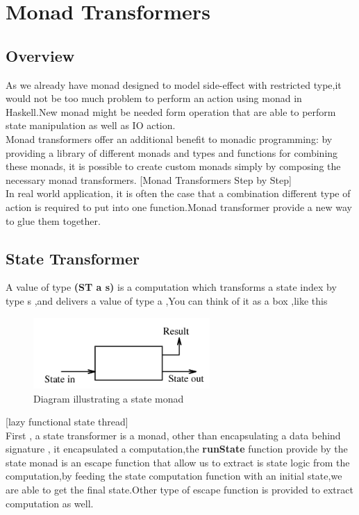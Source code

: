 \chapter{Monad Transformers}
\section{Overview}

As we already have monad designed to model side-effect with restricted type,it would not be too much problem to perform an action using monad in Haskell.New monad might be needed form operation that are able to perform state manipulation as well as IO action.\\

Monad transformers offer an additional benefit to monadic programming: by providing a
library of different monads and types and functions for combining these monads, it is possible
to create custom monads simply by composing the necessary monad transformers. [Monad Transformers Step by Step]\\

In real world application, it is often the case that a combination different type of action is required to put into one function.Monad transformer provide a new way to glue them together.

\section{State Transformer}
A value of type \textbf{(ST a s)} is a computation which transforms a state index by type s ,and delivers a value of type a ,You can think of it as a box ,like this 
\begin{figure}[H]
  \centering
	\includegraphics[width=0.60\textwidth]{pic/c3/state.png}
	\caption{Diagram illustrating a state monad}
\end{figure}
[lazy functional state thread]
\\

First , a state transformer is a monad, other than encapsulating a data behind signature , it encapsulated a computation,the \textbf{runState} function provide by the state monad is an escape function that allow us to extract is state logic from the computation,by feeding the state computation function with an initial state,we are able to get the final state.Other type of escape function is provided to extract computation as well.

